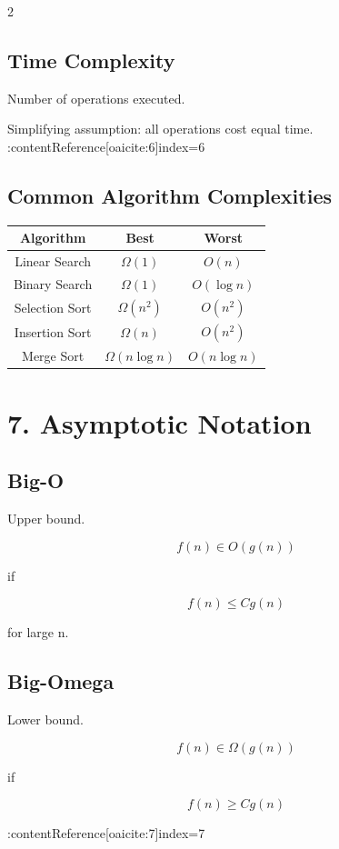\documentclass[10pt]{article}
\begin{document}
\begin{multicols}{2}
\subsection*{Time Complexity}

Number of operations executed.

Simplifying assumption: all operations cost equal time. :contentReference[oaicite:6]{index=6}

\subsection*{Common Algorithm Complexities}

\begin{tabular}{c|c|c}
Algorithm & Best & Worst \\
\hline
Linear Search & $\Omega(1)$ & $O(n)$ \\
Binary Search & $\Omega(1)$ & $O(\log n)$ \\
Selection Sort & $\Omega(n^2)$ & $O(n^2)$ \\
Insertion Sort & $\Omega(n)$ & $O(n^2)$ \\
Merge Sort & $\Omega(n\log n)$ & $O(n\log n)$
\end{tabular}

\section*{7. Asymptotic Notation}

\subsection*{Big-O}

Upper bound.

\[
f(n) \in O(g(n))
\]

if

\[
f(n) \le Cg(n)
\]

for large n.

\subsection*{Big-Omega}

Lower bound.

\[
f(n) \in \Omega(g(n))
\]

if

\[
f(n) \ge Cg(n)
\]

:contentReference[oaicite:7]{index=7}


\end{multicols}
\end{document}
